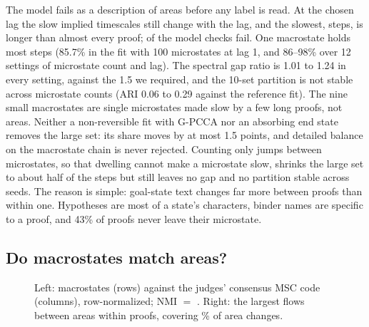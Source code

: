 The model fails as a description of areas before any label is read. At the
chosen lag the slow implied timescales still change with the lag, and the
slowest, \resSlowestTimescale{} steps, is longer than almost every proof;
\resChecksFailed{} of the model checks fail. One macrostate holds most steps
(85.7\% in the fit with 100 microstates at lag 1, and 86--98\% over 12
settings of microstate count and lag). The spectral gap ratio is 1.01 to 1.24
in every setting, against the 1.5 we required, and the 10-set partition is
not stable across microstate counts (ARI 0.06 to 0.29 against the reference
fit). The nine small macrostates are single microstates made slow by a few
long proofs, not areas. Neither a non-reversible fit with G-PCCA nor an
absorbing end state removes the large set: its share moves by at most 1.5
points, and detailed balance on the macrostate chain is never rejected.
Counting only jumps between microstates, so that dwelling cannot make a
microstate slow, shrinks the large set to about half of the steps but still
leaves no gap and no partition stable across seeds. The reason is simple:
goal-state text changes far more between proofs than within one. Hypotheses
are most of a state's characters, binder names are specific to a proof, and
43\% of proofs never leave their microstate.

\subsection{Do macrostates match areas?}

\begin{figure}[t]
  \centering
  \hfill
  \caption{Left: macrostates (rows) against the judges' consensus MSC code
  (columns), row-normalized; NMI $=$ \resMacroNMI. Right: the \resFlowsShown{}
  largest flows between areas within proofs, covering \resFlowCoverage\% of
  area changes.}
  \label{fig:areas}
\end{figure}

